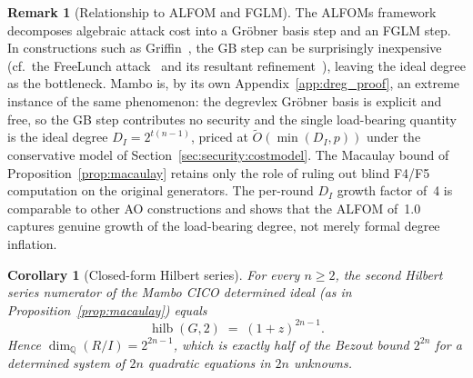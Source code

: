 \documentclass[11pt,a4paper]{article}
\newtheorem{corollary}[theorem]{Corollary}
\theoremstyle{definition}
\newtheorem{remark}[theorem]{Remark}
\begin{document}
\begin{remark}[Relationship to ALFOM and FGLM]\label{rem:alfom_fglm}
The ALFOMs framework~\cite{ALFOMs} decomposes algebraic attack cost into
a Gr\"obner basis step and an FGLM step. In constructions such as
Griffin~\cite{Griffin}, the GB step can be surprisingly inexpensive
(cf.~the FreeLunch attack~\cite{FreeLunch} and its resultant
refinement~\cite{Griffin_break}), leaving the
ideal degree as the bottleneck. Mambo is, by its own
Appendix~\ref{app:dreg_proof}, an extreme instance of the same
phenomenon: the degrevlex Gr\"obner basis is explicit and free, so
the GB step contributes no security and the single load-bearing
quantity is the ideal degree $D_I = 2^{t(n-1)}$, priced at
$\widetilde{O}(\min(D_I, p))$ under the conservative model of
Section~\ref{sec:security:costmodel}. The Macaulay bound of
Proposition~\ref{prop:macaulay} retains only the role of ruling out
blind F4/F5 computation on the original generators. The per-round
$D_I$ growth factor of~4 is comparable to other AO constructions and
shows that the ALFOM of~1.0 captures genuine growth of the
load-bearing degree, not merely formal degree inflation.
\end{remark}

\begin{corollary}[Closed-form Hilbert series]\label{cor:hilbseries_closedform}
For every $n \ge 2$, the second Hilbert series numerator of the Mambo
CICO determined ideal (as in Proposition~\ref{prop:macaulay}) equals
\[
  \operatorname{hilb}(G, 2) \;=\; (1+z)^{2n-1}.
\]
Hence $\dim_{\mathbb{Q}}(R/I) = 2^{2n-1}$, which is exactly half of
the Bezout bound $2^{2n}$ for a determined system of $2n$ quadratic
equations in $2n$ unknowns.
\end{corollary}
\end{document}
